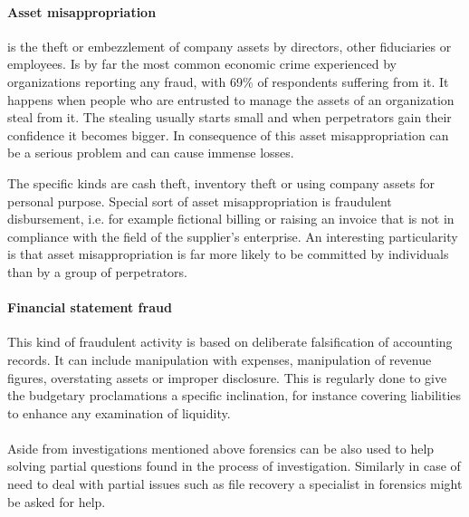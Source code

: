 \paragraph {Asset misappropriation}
is the theft or embezzlement of company assets by directors, other fiduciaries or employees. Is by far the most common economic crime experienced by organizations reporting any fraud, with 69\% of respondents suffering from it. \cite{pwc-asset} It happens when people who are entrusted to manage the assets of an organization steal from it. The stealing usually starts small and when perpetrators gain their confidence it becomes bigger. In consequence of this asset misappropriation can be a serious problem and can cause immense losses. 

The specific kinds are cash theft, inventory theft or using company assets for personal purpose. Special sort of asset misappropriation is fraudulent disbursement, i.e. for example fictional billing or raising an invoice that is not in compliance with the field of the supplier's enterprise. An interesting particularity is that asset misappropriation is far more likely to be committed by individuals than by a group of perpetrators\cite{whitepaper}.


\paragraph {Financial statement fraud}
This kind of fraudulent activity is based on deliberate falsification of accounting records. It can include manipulation with expenses, manipulation of revenue figures, overstating assets or improper disclosure. This is regularly done to give the budgetary proclamations a specific inclination, for instance covering liabilities to enhance any examination of liquidity.


\paragraph{} Aside from investigations mentioned above forensics can be also used to help solving partial questions found in the process of investigation. Similarly in case of need to deal with partial issues such as file recovery a specialist in forensics might be asked for help.

